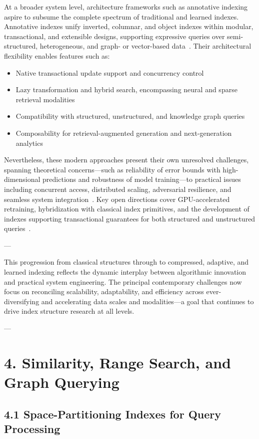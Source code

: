 \documentclass[11pt]{article}
\begin{document}
At a broader system level, architecture frameworks such as annotative indexing aspire to subsume the complete spectrum of traditional and learned indexes. Annotative indexes unify inverted, columnar, and object indexes within modular, transactional, and extensible designs, supporting expressive queries over semi-structured, heterogeneous, and graph- or vector-based data~\cite{112}. Their architectural flexibility enables features such as:
\begin{itemize}
    \item Native transactional update support and concurrency control
    \item Lazy transformation and hybrid search, encompassing neural and sparse retrieval modalities
    \item Compatibility with structured, unstructured, and knowledge graph queries
    \item Composability for retrieval-augmented generation and next-generation analytics
\end{itemize}

Nevertheless, these modern approaches present their own unresolved challenges, spanning theoretical concerns—such as reliability of error bounds with high-dimensional predictions and robustness of model training—to practical issues including concurrent access, distributed scaling, adversarial resilience, and seamless system integration~\cite{105,110,111,112}. Key open directions cover GPU-accelerated retraining, hybridization with classical index primitives, and the development of indexes supporting transactional guarantees for both structured and unstructured queries~\cite{111,112}.

---

This progression from classical structures through to compressed, adaptive, and learned indexing reflects the dynamic interplay between algorithmic innovation and practical system engineering. The principal contemporary challenges now focus on reconciling scalability, adaptability, and efficiency across ever-diversifying and accelerating data scales and modalities—a goal that continues to drive index structure research at all levels.

---
\section{4. Similarity, Range Search, and Graph Querying}

\subsection{4.1 Space-Partitioning Indexes for Query Processing}
\end{document}
